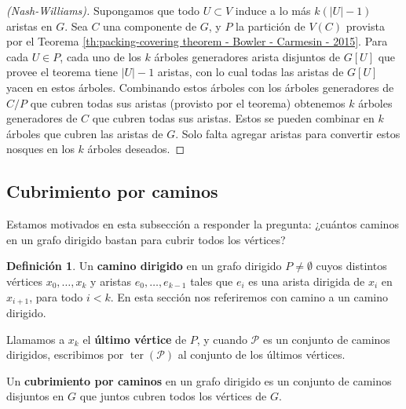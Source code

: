 \documentclass[12pt]{report}
\theoremstyle{plain}
\theoremstyle{definition}
\newtheorem{definition}[theorem]{Definición}
\newcommand{\abs}[1]{\left \vert #1 \right \vert}
\newcommand{\ter}[1]{\operatorname{ter} (#1)}
\begin{document}
\begin{proof}[(Nash-Williams)]
Supongamos que todo $U\subset V$ induce a lo más $k (\abs U - 1)$ aristas en $G$. Sea $C$ una componente de $G$, y $P$ la partición de $V(C)$ provista por el Teorema \ref{th:packing-covering theorem - Bowler - Carmesin - 2015}. Para cada $U \in P$, cada uno de los $k$ árboles generadores arista disjuntos de $G[U]$ que provee el teorema tiene $\abs U -1$ aristas, con lo cual todas las aristas de $G[U]$ yacen en estos árboles. Combinando estos árboles con los árboles generadores de $C/P$ que cubren todas sus aristas (provisto por el teorema) obtenemos $k$ árboles generadores de $C$ que cubren todas sus aristas. Estos se pueden combinar en $k$ árboles que cubren las aristas de $G$. Solo falta agregar aristas para convertir estos nosques en los $k$ árboles deseados.

\end{proof}




\subsection{Cubrimiento por caminos}

Estamos motivados en esta subsección a responder la pregunta: ¿cuántos caminos en un grafo dirigido bastan para cubrir todos los vértices?

\begin{definition}
Un \textbf{camino dirigido} en un grafo dirigido $P \neq \emptyset$ cuyos distintos vértices $x_0,\ldots,x_k$ y aristas $e_0, \ldots, e_{k-1}$ tales que $e_i$ es una arista dirigida de $x_i$ en $x_{i+1}$, para todo $i < k$. En esta sección nos referiremos con camino a un camino dirigido.

Llamamos a $x_k$ el \textbf{último vértice} de $P$, y cuando $\mathcal P$ es un conjunto de caminos dirigidos, escribimos por $\ter {\mathcal P}$ al conjunto de los últimos vértices.

Un \textbf{cubrimiento por caminos} en un grafo dirigido es un conjunto de caminos disjuntos en $G$ que juntos cubren todos los vértices de $G$.
\end{definition}
\end{document}
